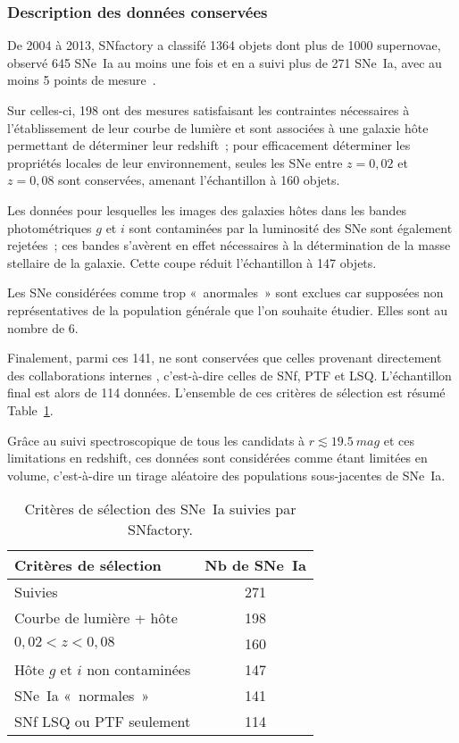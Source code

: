 \documentclass[../main/main.tex]{subfiles}
\begin{document}

\subsubsection{Description des données conservées}\label{sssec:snfdata}

De 2004 à 2013, SNfactory a classifé 1364 objets dont plus de 1000 supernovae,
observé 645 SNe~Ia au moins une fois et en a suivi plus de 271 SNe~Ia, avec au
moins 5 points de mesure~\citep{copin2013}.

Sur celles-ci, 198 ont des mesures satisfaisant les contraintes nécessaires à
l'établissement de leur courbe de lumière et sont associées à une galaxie hôte
permettant de déterminer leur redshift~; pour efficacement déterminer les
propriétés locales de leur environnement, seules les SNe entre $z = 0,02$ et $z
= 0,08$ sont conservées, amenant l'échantillon à 160 objets.

Les données pour lesquelles les images des galaxies hôtes dans les bandes
photométriques $g$ et $i$ sont contaminées par la luminosité des SNe sont
également rejetées~; ces bandes s'avèrent en effet nécessaires à la
détermination de la masse stellaire de la galaxie. Cette coupe réduit
l'échantillon à 147 objets.

Les SNe considérées comme trop «~anormales~» sont exclues car supposées non
représentatives de la population générale que l'on souhaite étudier. Elles sont
au nombre de 6.

Finalement, parmi ces 141, ne sont conservées que celles provenant directement
des collaborations internes , c'est-à-dire
celles de SNf, PTF et LSQ. L'échantillon final est alors de 114 données.  
L'ensemble de ces critères de sélection est résumé Table~\ref{tab:snfcuts}.

Grâce au suivi spectroscopique de tous les candidats à $r \lesssim
\SI{19,5}{mag}$ et ces limitations en redshift, ces données sont considérées
comme étant limitées en volume, c'est-à-dire un tirage aléatoire des populations
sous-jacentes de SNe~Ia.

\begin{table}[]
    \centering
    \caption{Critères de sélection des SNe~Ia suivies par SNfactory.}
    \label{tab:snfcuts}
    \begin{tabular}{lc}
        \toprule
        Critères de sélection           & Nb de SNe~Ia \\
        \midrule
        Suivies                         & 271 \\
        Courbe de lumière + hôte        & 198 \\
        $0,02 < z < 0,08$               & 160 \\
        Hôte $g$ et $i$ non contaminées & 147 \\
        SNe~Ia «~normales~»             & 141 \\
        SNf LSQ ou PTF seulement        & 114 \\
        \bottomrule
    \end{tabular}
\end{table}
\end{document}
